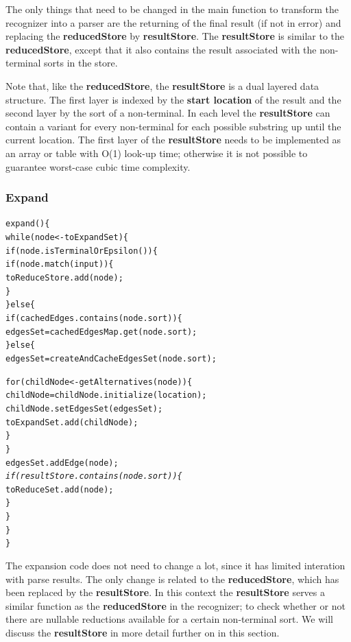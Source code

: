 \documentclass[a4paper,10pt]{article}
\begin{document}
The only things that need to be changed in the main function to transform the recognizer into a parser are the returning of the final result (if not in error) and replacing the {\bf reducedStore} by {\bf resultStore}. The {\bf resultStore} is similar to the {\bf reducedStore}, except that it also contains the result associated with the non-terminal sorts in the store.

Note that, like the {\bf reducedStore}, the {\bf resultStore} is a dual layered data structure. The first layer is indexed by the {\bf start location} of the result and the second layer by the sort of a non-terminal. In each level the {\bf resultStore} can contain a variant for every non-terminal for each possible substring up until the current location. The first layer of the {\bf resultStore} needs to be implemented as an array or table with O(1) look-up time; otherwise it is not possible to guarantee worst-case cubic time complexity.

\pagebreak
\subsubsection{Expand}
{\small
\begin{alltt}
expand()\{
  while(node <- toExpandSet)\{
    if(node.isTerminalOrEpsilon())\{
      if(node.match(input))\{
        toReduceStore.add(node);
      \}
    \}else\{
      if(cachedEdges.contains(node.sort))\{
        edgesSet = cachedEdgesMap.get(node.sort);
      \}else\{
        edgesSet = createAndCacheEdgesSet(node.sort);
        
        for(childNode <- getAlternatives(node))\{
          childNode = childNode.initialize(location);
          childNode.setEdgesSet(edgesSet);
          toExpandSet.add(childNode);
        \}
      \}
      edgesSet.addEdge(node);
      \textit{
      if(resultStore.contains(node.sort))\{}
        toReduceSet.add(node);
      \}
    \}
  \}
\}
\end{alltt}
}

The expansion code does not need to change a lot, since it has limited interation with parse results. The only change is related to the {\bf reducedStore}, which has been replaced by the {\bf resultStore}. In this context the {\bf resultStore} serves a similar function as the {\bf reducedStore} in the recognizer; to check whether or not there are nullable reductions available for a certain non-terminal sort. We will discuss the {\bf resultStore} in more detail further on in this section.
\end{document}
